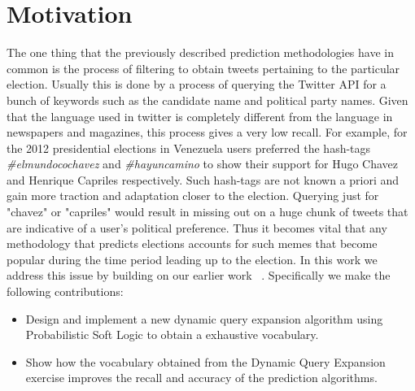 \section{Motivation}
The one thing that the previously described prediction methodologies have in common is the process of filtering to obtain tweets pertaining to the particular election.
Usually this is done by a process of querying the Twitter API for a bunch of keywords such as the candidate name and political party names.
Given that the language used in twitter is completely different from the language in newspapers and magazines, this process gives a very low recall.
For example, for the 2012 presidential elections in Venezuela users preferred  the hash-tags \emph{\#elmundocochavez} and \emph{\#hayuncamino} to show their support for Hugo Chavez and Henrique Capriles respectively.
Such hash-tags are not known a priori and gain more traction and adaptation closer to the election.
Querying just for "chavez" or "capriles" would result in missing out on a huge chunk of tweets that are indicative of a user's political preference.
Thus it becomes vital that any methodology that predicts elections accounts for such memes that become popular during the time period leading up to the election.
In this work we address this issue by building on our earlier work ~\cite{huang2012social}.
Specifically we make the following contributions:
\begin{itemize}
\item
Design and implement a new dynamic query expansion algorithm using Probabilistic Soft Logic to obtain a exhaustive vocabulary.
\item
Show how the vocabulary obtained from the Dynamic Query Expansion exercise improves the recall and accuracy of the prediction algorithms.
\end{itemize}